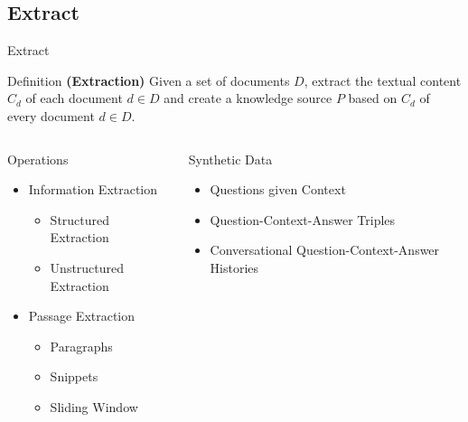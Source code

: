 \documentclass{beamer}
\begin{document}
\subsection*{Extract}
\begin{frame}{Extract}

  \begin{block}{Definition}
    \textbf{(Extraction)} Given a set of documents $D$, extract the textual content $C_d$ of each document $d \in D$ and create a knowledge source $P$ based on $C_d$ of every document $d \in D$. 
  \end{block}

  \begin{columns}[T] %
    \begin{column}{.5\textwidth}
      {\color{unirot}Operations}
      \begin{itemize}
        \item Information Extraction
        \begin{itemize}
          \item Structured Extraction
          \item Unstructured Extraction
        \end{itemize}
        \item Passage Extraction 
        \begin{itemize}
          \item Paragraphs
          \item Snippets
          \item Sliding Window
        \end{itemize}
      \end{itemize}
    \end{column}
    
    \begin{column}{.5\textwidth}
      {\color{unirot}Synthetic Data}
      \begin{itemize}
        \item Questions given Context
        \item Question-Context-Answer Triples
        \item Conversational Question-Context-Answer Histories
      \end{itemize}
    \end{column}
  \end{columns}
\end{frame}
\end{document}
